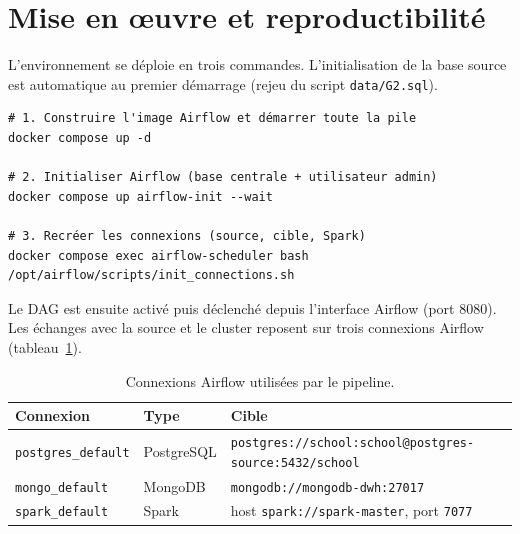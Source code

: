 ﻿\documentclass[10pt,a4paper]{article}
\begin{document}
\section{Mise en œuvre et reproductibilité}\label{sec:repro}
L'environnement se déploie en trois commandes. L'initialisation de la base source est automatique
au premier démarrage (rejeu du script \texttt{data/G2.sql}).

\begin{verbatim}
# 1. Construire l'image Airflow et démarrer toute la pile
docker compose up -d

# 2. Initialiser Airflow (base centrale + utilisateur admin)
docker compose up airflow-init --wait

# 3. Recréer les connexions (source, cible, Spark)
docker compose exec airflow-scheduler bash /opt/airflow/scripts/init_connections.sh
\end{verbatim}

Le DAG est ensuite activé puis déclenché depuis l'interface Airflow (port 8080). Les échanges avec
la source et le cluster reposent sur trois connexions Airflow (tableau~\ref{tab:connex}).

\begin{table}[h]
  \centering
  \small
  \begin{tabular}{@{}lll@{}}
    \toprule
    \textbf{Connexion} & \textbf{Type} & \textbf{Cible} \\
    \midrule
    \texttt{postgres\_default} & PostgreSQL & \texttt{postgres://school:school@postgres-source:5432/school} \\
    \texttt{mongo\_default} & MongoDB & \texttt{mongodb://mongodb-dwh:27017} \\
    \texttt{spark\_default} & Spark & host \texttt{spark://spark-master}, port \texttt{7077} \\
    \bottomrule
  \end{tabular}
  \caption{Connexions Airflow utilisées par le pipeline.}
  \label{tab:connex}
\end{table}
\end{document}
